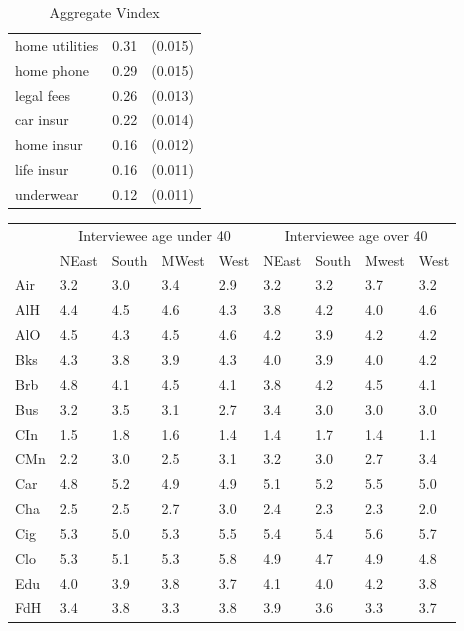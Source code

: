 \begin{table}[!ht]
\begin{tabular}{lcc}
home utilities   & 0.31 & (0.015) \\
home phone       & 0.29 & (0.015) \\
legal fees       & 0.26 & (0.013) \\
car insur        & 0.22 & (0.014) \\
home insur       & 0.16 & (0.012) \\
life insur       & 0.16 & (0.011) \\
underwear        & 0.12 & (0.011) \\
\hline
\end{tabular}
\caption{Aggregate Vindex}
\label{tab:vintab}
\vspace{-2in}
\end{table}

\begin{table}[!ht]
    \centering
    {\footnotesize
    \begin{tabular}{lllllllll}
        \hline
        & \multicolumn{4}{c}{Interviewee age under 40} & \multicolumn{4}{c}{Interviewee age over 40}\\
            & NEast & South & MWest & West  & NEast & South & Mwest & West \\
        \hline\hline
        Air & 3.2 & 3.0 & 3.4 & 2.9 & 3.2 & 3.2 & 3.7 & 3.2\\
        AlH & 4.4 & 4.5 & 4.6 & 4.3 & 3.8 & 4.2 & 4.0 & 4.6\\
        AlO & 4.5 & 4.3 & 4.5 & 4.6 & 4.2 & 3.9 & 4.2 & 4.2\\
        Bks & 4.3 & 3.8 & 3.9 & 4.3 & 4.0 & 3.9 & 4.0 & 4.2\\
        Brb & 4.8 & 4.1 & 4.5 & 4.1 & 3.8 & 4.2 & 4.5 & 4.1\\
        Bus & 3.2 & 3.5 & 3.1 & 2.7 & 3.4 & 3.0 & 3.0 & 3.0\\
        CIn & 1.5 & 1.8 & 1.6 & 1.4 & 1.4 & 1.7 & 1.4 & 1.1\\
        CMn & 2.2 & 3.0 & 2.5 & 3.1 & 3.2 & 3.0 & 2.7 & 3.4\\
        Car & 4.8 & 5.2 & 4.9 & 4.9 & 5.1 & 5.2 & 5.5 & 5.0\\
        Cha & 2.5 & 2.5 & 2.7 & 3.0 & 2.4 & 2.3 & 2.3 & 2.0\\
        Cig & 5.3 & 5.0 & 5.3 & 5.5 & 5.4 & 5.4 & 5.6 & 5.7\\
        Clo & 5.3 & 5.1 & 5.3 & 5.8 & 4.9 & 4.7 & 4.9 & 4.8\\
        Edu & 4.0 & 3.9 & 3.8 & 3.7 & 4.1 & 4.0 & 4.2 & 3.8\\
        FdH & 3.4 & 3.8 & 3.3 & 3.8 & 3.9 & 3.6 & 3.3 & 3.7\\

\end{tabular}}
\end{table}
